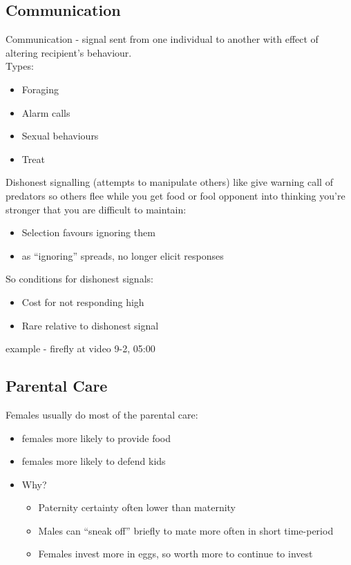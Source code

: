 \documentclass{scrartcl}
\begin{document}
\subsection{Communication}
\label{sec:9-2-0}
Communication - signal sent from one individual to another with effect of altering recipient's behaviour.\\
Types:
\begin{itemize}
\item Foraging
\item Alarm calls
\item Sexual behaviours
\item Treat
\end{itemize}
Dishonest signalling (attempts to manipulate others) like give warning call of predators so others flee while you get food or fool opponent into thinking you're stronger that you are difficult to maintain:
\begin{itemize}
\item Selection favours ignoring them
\item as ``ignoring'' spreads, no longer elicit responses
\end{itemize}
So conditions for dishonest signals:
\begin{itemize}
\item Cost for not responding high
\item Rare relative to dishonest signal
\end{itemize}
example - firefly at video 9-2, 05:00

\subsection{Parental Care}
\label{sec:09-02-1}
Females usually do most of the parental care:
\begin{itemize}
\item females more likely to provide food
\item females more likely to defend kids
\item Why?
  \begin{itemize}
  \item Paternity certainty often lower than maternity
  \item Males can ``sneak off'' briefly to mate more often in short time-period
  \item Females invest more in eggs, so worth more to continue to invest
  \end{itemize}
\end{itemize}
\end{document}
